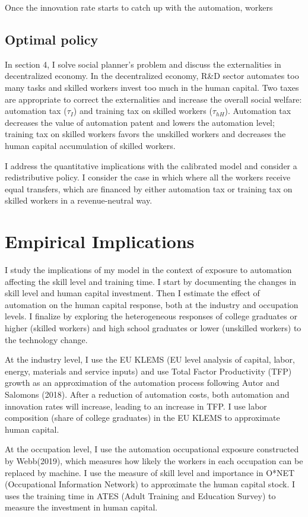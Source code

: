 \documentclass[12pt]{article}
\begin{document}
Once the innovation rate starts to catch up with the automation, workers 


\subsection{Optimal policy}
In section 4, I solve social planner's problem and discuss the externalities in decentralized economy. In the decentralized economy, R\&D sector automates too many tasks and skilled workers invest too much in the human capital. Two taxes are appropriate to correct the externalities and increase the overall social welfare: automation tax ($\tau_I$) and training tax on skilled workers ($\tau_{hH}$). Automation tax decreases the value of automation patent and lowers the automation level; training tax on skilled workers favors the unskilled workers and decreases the human capital accumulation of skilled workers. 

I address the quantitative implications with the calibrated model and consider a redistributive policy. I consider the case in which where all the workers receive equal transfers, which are financed by either automation tax or training tax on skilled workers in a revenue-neutral way. 


\section{Empirical Implications}
I study the implications of my model in the context of exposure to automation affecting the skill level and training time. I start by documenting the changes in skill level and human capital investment. Then I estimate the effect of automation on the human capital response, both at the industry and occupation levels. I finalize by exploring the heterogeneous responses of college graduates or higher (skilled workers) and high school graduates or lower (unskilled workers) to the technology change. 

At the industry level, I use the EU KLEMS (EU level analysis of capital, labor, energy, materials and service inputs) and use Total Factor Productivity (TFP) growth as an approximation of the automation process following Autor and Salomons (2018)\nocite{AutorSalomons2018}. After a reduction of automation costs, both automation and innovation rates will increase, leading to an increase in TFP. I use labor composition (share of college graduates) in the EU KLEMS to approximate human capital. 

At the occupation level, I use the automation occupational exposure constructed by Webb(2019)\nocite{Webb2019}, which measures how likely the workers in each occupation can be replaced by machine. I use the measure of skill level and importance in O*NET (Occupational Information Network) to approximate the human capital stock. I uses the training time in ATES (Adult Training and Education Survey) to measure the investment in human capital. 
\end{document}
